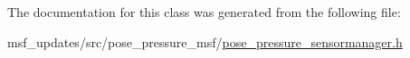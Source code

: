 The documentation for this class was generated from the following file\-:\begin{DoxyCompactItemize}
\item 
msf\-\_\-updates/src/pose\-\_\-pressure\-\_\-msf/\hyperlink{pose__pressure__sensormanager_8h}{pose\-\_\-pressure\-\_\-sensormanager.\-h}\end{DoxyCompactItemize}
